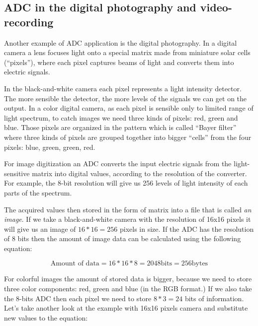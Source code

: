 \documentclass[../sparc.tex]{subfiles}
\begin{document}
\subsection{ADC in the digital photography and video-recording}


Another example of \gls{ADC} application is the digital photography.  In a
digital camera a lens focuses light onto a special matrix made from miniature
solar cells (``pixels''), where each pixel captures beams of light and converts
them into electric signals. \cite{expertphotography}

In the black-and-white camera each pixel represents a light intensity detector.
The more sensible the detector, the more levels of the signals we can get on the
output.  In a color digital camera, as each pixel is sensible only to limited
range of light spectrum, to catch images we need three kinds of pixels: red,
green and blue.  Those pixels are organized in the pattern which is called
``Bayer filter'' where three kinds of pixels are grouped together into bigger
``cells'' from the four pixels: blue, green, green, red.

For image digitization an ADC converts the input electric signals from the
light-sensitive matrix into digital values, according to the resolution of the
converter.  For example, the 8-bit resolution will give us 256 levels of light
intensity of each parts of the spectrum.

The acquired values then stored in the form of matrix into a file that is called
\emph{an image}.  If we take a black-and-white camera with the resolution of
16x16 pixels it will give us an image of $16 * 16 = 256$ pixels in size.  If the
ADC has the resolution of 8 bits then the amount of image data can be calculated using the following equation:

\begin{equation}
  \mbox{Amount of data} = 16 * 16 * 8 = 2048 \mbox{bits} = 256 \mbox{bytes}
  \label{equation:adc-image-0}
\end{equation}

For colorful images the amount of stored data is bigger, because we need to
store three color components: red, green and blue (in the RGB format.)  If we
also take the 8-bits ADC then each pixel we need to store $8 * 3 = 24$ bits of
information.  Let's take another look at the example with 16x16 pixels camera
and substitute new values to the equation:
\end{document}
